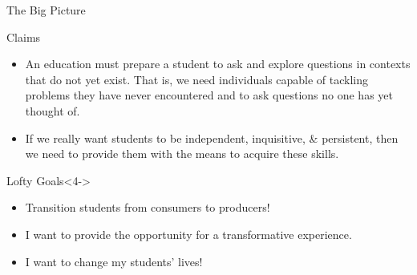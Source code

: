 \documentclass[10pt]{beamer}
\begin{document}

\begin{frame}{The Big Picture}

\begin{block}{Claims}
\vspace{-.75em}
\begin{itemize}
\item<2-> An education must prepare a student to ask and explore questions in contexts that do not yet exist. That is, we need individuals capable of tackling problems they have never encountered and to ask questions no one has yet thought of.
\item<3-> If we really want students to be independent, inquisitive, \& persistent, then we need to provide them with the means to acquire these skills.
\end{itemize}
\end{block}

\begin{block}{Lofty Goals}<4->
\vspace{-.75em}
\begin{itemize}
\item<5-> Transition students from consumers to producers!
\item<6-> I want to provide the opportunity for a transformative experience. 
\item<7-> I want to change my students' lives!
\end{itemize}
\end{block}

\end{frame}

\end{document}
